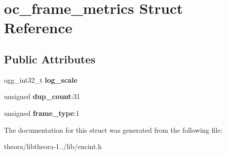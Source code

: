 \hypertarget{structoc__frame__metrics}{\section{oc\+\_\+frame\+\_\+metrics Struct Reference}
\label{structoc__frame__metrics}
}
\subsection*{Public Attributes}
\begin{DoxyCompactItemize}
\item 
\hypertarget{structoc__frame__metrics_a3e3d3a23966e0e6592727f70f6378632}{ogg\+\_\+int32\+\_\+t {\bfseries log\+\_\+scale}}\label{structoc__frame__metrics_a3e3d3a23966e0e6592727f70f6378632}

\item 
\hypertarget{structoc__frame__metrics_a67b633bac39e4f033cc84b06c4107779}{unsigned {\bfseries dup\+\_\+count}\+:31}\label{structoc__frame__metrics_a67b633bac39e4f033cc84b06c4107779}

\item 
\hypertarget{structoc__frame__metrics_ab0883d8d6dc72878c27ac60dbace0c48}{unsigned {\bfseries frame\+\_\+type}\+:1}\label{structoc__frame__metrics_ab0883d8d6dc72878c27ac60dbace0c48}

\end{DoxyCompactItemize}


The documentation for this struct was generated from the following file\+:\begin{DoxyCompactItemize}
\item 
theora/libtheora-\/1../lib/encint.\+h\end{DoxyCompactItemize}
